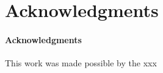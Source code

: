 \section{Acknowledgments}
\label{sec:acknowledgement}

\paragraph{Acknowledgments}
This work was made possible by the xxx 

